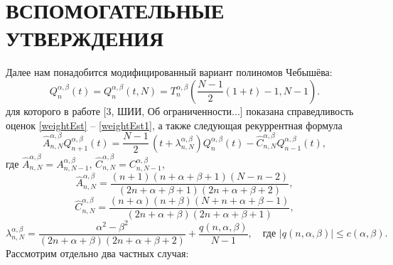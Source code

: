 \documentclass[12pt]{book}
\begin{document}
\section*{ВСПОМОГАТЕЛЬНЫЕ УТВЕРЖДЕНИЯ}

Далее нам понадобится модифицированный вариант полиномов Чебыш\"ева:
\begin{equation}\label{Qnn}
 Q_{n}^{\alpha,\beta}(t) = Q_{n}^{\alpha,\beta}(t,N) = T_{n}^{\alpha,\beta}\left( \frac{N-1}{2}(1+t) - 1, N-1 \right).
\end{equation}
для которого в работе [3, ШИИ, Об ограниченности...] показана справедливость оценок \eqref{weightEst} -- \eqref{weightEst1}, а также следующая рекуррентная формула
\begin{equation}\label{recurQ}
  \hat{A}^{\alpha,\beta}_{n,N} Q^{\alpha,\beta}_{n+1}(t) = \frac{N-1}{2}\,(t+\lambda^{\alpha,\beta}_{n,N}) Q^{\alpha,\beta}_{n}(t) - \hat{C}^{\alpha,\beta}_{n,N} Q^{\alpha,\beta}_{n-1}(t),
\end{equation}
где $\hat{A}^{\alpha,\beta}_{n,N}= A^{\alpha,\beta}_{n,N-1}$, $\hat{C}^{\alpha,\beta}_{n,N} = C^{\alpha,\beta}_{n,N-1}$,
\begin{equation*}
  \hat{A}^{\alpha,\beta}_{n,N} = \frac{(n+1)(n+\alpha+\beta+1)(N-n-2)}{(2n+\alpha+\beta+1)(2n+\alpha+\beta+2)},
\end{equation*}
\begin{equation*}
  \hat{C}^{\alpha,\beta}_{n,N} = \frac{(n+\alpha)(n+\beta)(N+n+\alpha+\beta-1)}{(2n+\alpha+\beta)(2n+\alpha+\beta+1)},
\end{equation*}
\begin{equation*}
  \lambda^{\alpha,\beta}_{n,N} = \frac{\alpha^2-\beta^2}{(2n+\alpha+\beta)(2n+\alpha+\beta+2)}+\frac{q(n,\alpha,\beta)}{N-1}, \quad \text{где } |q(n,\alpha,\beta)| \leq c(\alpha,\beta).
\end{equation*}
Рассмотрим отдельно два частных случая:
\end{document}
